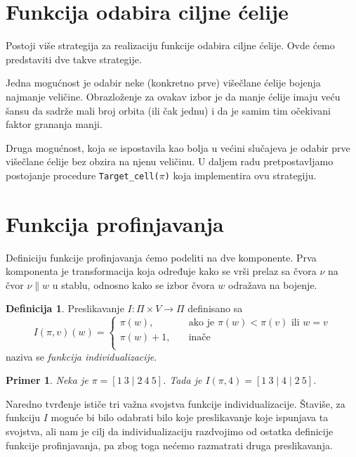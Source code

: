 \documentclass[12pt,oneside]{memoir}
\newtheorem{example}{Primer}
\theoremstyle{definition}
\newtheorem*{definition}{Definicija}
\begin{document}
 \section{Funkcija odabira ciljne ćelije}

 Postoji više strategija za realizaciju funkcije odabira ciljne ćelije. Ovde
 ćemo predstaviti dve takve strategije.

 Jedna mogućnost je odabir neke (konkretno prve) višečlane ćelije bojenja
 najmanje veličine. Obrazloženje za ovakav izbor je da manje ćelije imaju veću
 šansu da sadrže mali broj orbita (ili čak jednu) \cite{McKay} i da je samim
 tim očekivani faktor grananja manji.

 Druga mogućnost, koja se ispostavila kao bolja u većini slučajeva \cite{McKay1}
 je odabir prve višečlane ćelije bez obzira na njenu veličinu. U daljem radu
 pretpostavljamo postojanje procedure \texttt{Target\_cell($\pi$)} koja
 implementira ovu strategiju.

 \section{Funkcija profinjavanja}

  Definiciju funkcije profinjavanja ćemo podeliti na dve komponente. Prva
  komponenta je transformacija koja određuje kako se vrši prelaz sa čvora $\nu$
  na čvor $\nu \| w$ u stablu, odnosno kako se izbor čvora $w$ odražava na
  bojenje.

  \begin{definition}
	  Preslikavanje $I : \Pi \times V \to \Pi$ definisano sa
	  $$
	  I(\pi, v)(w) =
	  \begin{cases}
		  \pi(w), & \quad \text{ako je } \pi(w) < \pi(v) \text{ ili } w = v \\
		  \pi(w) + 1, & \quad \text{inače}\\
	  \end{cases}
	  $$
	  naziva se \emph{funkcija individualizacije}.
  \end{definition}

  \begin{example}
	  Neka je $\pi = [1\ 3 \mid 2\ 4\ 5]$. Tada je $I(\pi, 4) = [1\ 3 \mid 4
	  \mid 2\ 5]$.
  \end{example}

  Naredno tvrđenje ističe tri važna svojstva funkcije individualizacije.
  Štaviše, za funkciju $I$ moguće bi bilo odabrati bilo koje preslikavanje koje
  ispunjava ta svojstva, ali nam je cilj da individualizaciju razdvojimo od
  ostatka definicije funkcije profinjavanja, pa zbog toga nećemo razmatrati
  druga preslikavanja.
  
\end{document}
